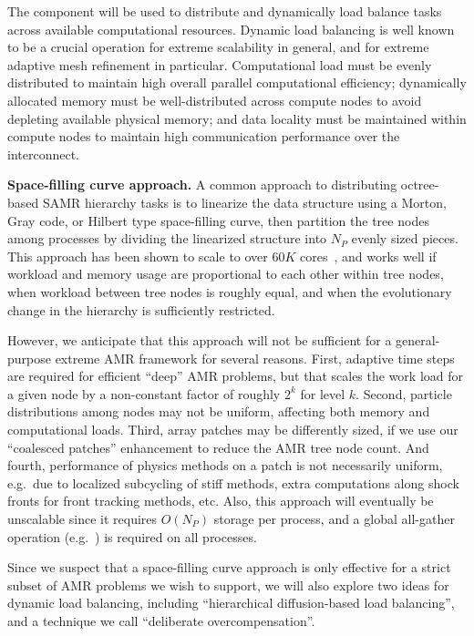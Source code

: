 \documentclass[10pt,twocolumn]{article}
\begin{document}
The  component will be used to distribute and
dynamically load balance tasks across available computational
resources.  Dynamic load balancing is well known to be a crucial
operation for extreme scalability in general, and for extreme adaptive
mesh refinement in particular.  Computational load must be evenly
distributed to maintain high overall parallel computational
efficiency; dynamically allocated memory must be well-distributed
across compute nodes to avoid depleting available physical memory; and
data locality must be maintained within compute nodes to maintain high
communication performance over the interconnect.

\textbf{Space-filling curve approach.}
A common approach to distributing octree-based SAMR hierarchy tasks is
to linearize the data structure using a Morton, Gray code, or Hilbert
type space-filling curve, then partition the tree nodes among
processes by dividing the linearized structure into $N_P$ evenly sized
pieces.  This approach has been shown to scale to over $60K$
cores~\cite{@@@ART}, and works well if workload and memory usage are
proportional to each other within tree nodes, when workload between
tree nodes is roughly equal, and when the evolutionary change in the
hierarchy is sufficiently restricted.

However, we anticipate that this approach will not be sufficient for a
general-purpose extreme AMR framework for several reasons.
%
First, adaptive time steps are required for efficient ``deep'' AMR
problems, but that scales the work load for a given node by a
non-constant factor of roughly $2^k$ for level $k$.
%
Second, particle distributions among nodes may not be uniform, affecting both memory and computational loads.
%
Third, array patches may be differently sized, if we use our
``coalesced patches'' enhancement to reduce the AMR tree node count.
%
And fourth, performance of physics methods on a patch is not
necessarily uniform, e.g.~due to localized subcycling of stiff
methods, extra computations along shock fronts for front tracking
methods, etc.  
%
Also, this approach will eventually be unscalable since it
requires $O(N_P)$ storage per process, and a global all-gather
operation (e.g.~) is required on all processes.

Since we suspect that a space-filling curve approach is only effective
for a strict subset of AMR problems we wish to support, we will also
explore two ideas for dynamic load balancing, including ``hierarchical
diffusion-based load balancing'', and a technique we call
``deliberate overcompensation''.
\end{document}
